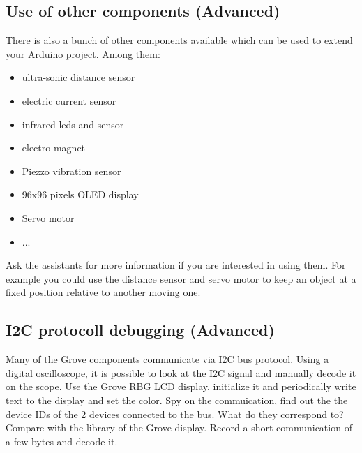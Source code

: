 \subsection{Use of other components (Advanced)}
There is also a bunch of other components available which can be used to extend your Arduino project. Among them:
\begin{itemize}
	\item ultra-sonic distance sensor
	\item electric current sensor
	\item infrared leds and sensor
	\item electro magnet
	\item Piezzo vibration sensor
	\item 96x96 pixels OLED display
	\item Servo motor
	\item ...
\end{itemize}

Ask the assistants for more information if you are interested in using them. For example you could use the distance sensor and servo motor to keep an object at a fixed position relative to another moving one.


\subsection{I2C protocoll debugging (Advanced)}
Many of the Grove components communicate via I2C bus protocol. Using a digital oscilloscope, it is possible to look at the I2C signal and manually decode it on the scope. Use the Grove RBG LCD display, initialize it and periodically write text to the display and set the color. Spy on the commuication, find out the the device IDs of the 2 devices connected to the bus. What do they correspond to? Compare with the library of the Grove display. Record a short communication of a few bytes and decode it.















